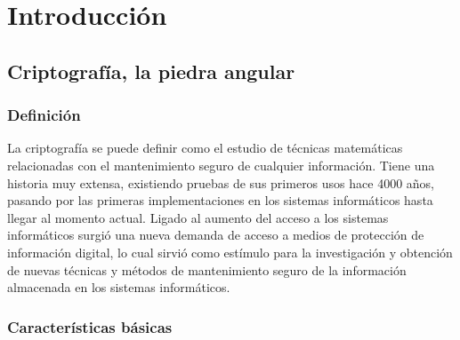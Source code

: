 \documentclass[12pt,spanish,listoffigures,listoftables]{tfgetsinf}
\begin{document}

\mainmatter


\chapter{Introducci\'on}


\section{Criptografía, la piedra angular}

\subsection{Definición}

La criptografía se puede definir como el estudio de técnicas matemáticas relacionadas con el mantenimiento seguro de cualquier información\cite{handbook}. Tiene una historia muy extensa, existiendo pruebas de sus primeros usos hace 4000 años, pasando por las primeras implementaciones en los sistemas informáticos hasta llegar al momento actual. Ligado al aumento del acceso a los sistemas informáticos surgió una nueva demanda de acceso a medios de protección de información digital, lo cual sirvió como estímulo para la investigación y obtención de nuevas técnicas y métodos de mantenimiento seguro de la información almacenada en los sistemas informáticos.

\subsection{Características básicas}
\end{document}
